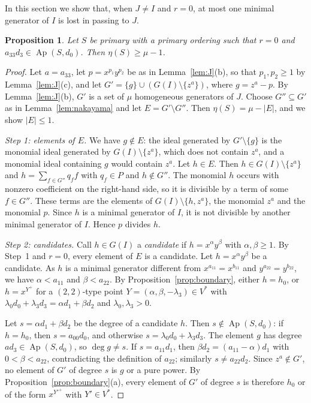 \documentclass{amsart}
\newtheorem{proposition}[theorem]{Proposition}
\theoremstyle{definition}
\theoremstyle{remark}
\numberwithin{equation}{section}
\newcommand{\Ap}{\operatorname{Ap}}
\newcommand{\Apd}{\Ap(S,d_0)}
\begin{document}
In this section we show that, when $J\neq I$ and $r=0$, at most one minimal generator of $I$ is lost in passing to $J$.

\begin{proposition}\label{prop:primary}
Let $S$ be primary with a primary ordering such that $r=0$ and $a_{33}d_3\in\Apd$. Then $\eta(S)\ge\mu-1$.
\end{proposition}

\begin{proof}
Let $a=a_{33}$, let $p=x^{p_1}y^{p_2}$ be as in Lemma~\ref{lem:J}(b), so that $p_1,p_2\ge1$ by Lemma~\ref{lem:J}(c), and let $G'=\{g\}\cup(G(I)\setminus\{z^a\})$, where $g=z^a-p$. By Lemma~\ref{lem:J}(b), $G'$ is a set of $\mu$ homogeneous generators of $J$. Choose $G''\subseteq G'$ as in Lemma~\ref{lem:nakayama} and let $E=G'\setminus G''$. Then $\eta(S)=\mu-|E|$, and we show $|E|\le1$.

\emph{Step 1: elements of $E$.} We have $g\notin E$: the ideal generated by $G'\setminus\{g\}$ is the monomial ideal generated by $G(I)\setminus\{z^a\}$, which does not contain $z^a$, and a monomial ideal containing $g$ would contain $z^a$. Let $h\in E$. Then $h\in G(I)\setminus\{z^a\}$ and $h=\sum_{f\in G''}q_ff$ with $q_f\in P$ and $h\notin G''$. The monomial $h$ occurs with nonzero coefficient on the right-hand side, so it is divisible by a term of some $f\in G''$. These terms are the elements of $G(I)\setminus\{h,z^a\}$, the monomial $z^a$ and the monomial $p$. Since $h$ is a minimal generator of $I$, it is not divisible by another minimal generator of $I$. Hence $p$ divides $h$.

\emph{Step 2: candidates.} Call $h\in G(I)$ a \emph{candidate} if $h=x^\alpha y^\beta$ with $\alpha,\beta\ge1$. By Step~1 and $r=0$, every element of $E$ is a candidate. Let $h=x^\alpha y^\beta$ be a candidate. As $h$ is a minimal generator different from $x^{a_{11}}=x^{b_{11}}$ and $y^{a_{22}}=y^{b_{22}}$, we have $\alpha<a_{11}$ and $\beta<a_{22}$. By Proposition~\ref{prop:boundary}, either $h=h_0$, or $h=x^{Y^+}$ for a $(2,2)$-type point $Y=(\alpha,\beta,-\lambda_3)\in V^*$ with $\lambda_0d_0+\lambda_3d_3=\alpha d_1+\beta d_2$ and $\lambda_0,\lambda_3>0$.

Let $s=\alpha d_1+\beta d_2$ be the degree of a candidate $h$. Then $s\notin\Apd$: if $h=h_0$, then $s=a_{00}d_0$, and otherwise $s=\lambda_0d_0+\lambda_3d_3$. The element $g$ has degree $ad_3\in\Apd$, so $\deg g\neq s$. If $s=a_{11}d_1$, then $\beta d_2=(a_{11}-\alpha)d_1$ with $0<\beta<a_{22}$, contradicting the definition of $a_{22}$; similarly $s\neq a_{22}d_2$. Since $z^a\notin G'$, no element of $G'$ of degree $s$ is $g$ or a pure power. By Proposition~\ref{prop:boundary}(a), every element of $G'$ of degree $s$ is therefore $h_0$ or of the form $x^{Y'^+}$ with $Y'\in V^*$.


\end{proof}
\end{document}
